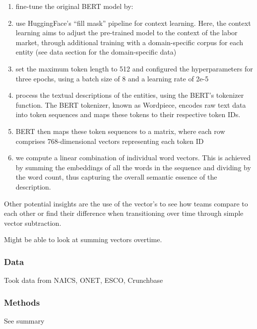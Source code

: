 \documentclass[12pt]{article}
\begin{document}
\begin{enumerate}
    \item  fine-tune the original BERT model by:
    \item use HuggingFace's “fill mask” pipeline for context learning. Here, the context learning aims to adjust the pre-trained model to the context of the labor market, through additional training with a domain-specific corpus for each entity (see data section for the domain-specific data)
    \item set the maximum token length to 512 and configured the hyperparameters for three epochs, using a batch size of 8 and a learning rate of 2e-5
    \item process the textual descriptions of the entities, using the BERT's tokenizer function. The BERT tokenizer, known as Wordpiece, encodes raw text data into token sequences and maps these tokens to their respective token IDs. 
    \item BERT then maps these token sequences to a matrix, where each row comprises 768-dimensional vectors representing each token ID
    \item  we compute a linear combination of individual word vectors. This is achieved by summing the embeddings of all the words in the sequence and dividing by the word count, thus capturing the overall semantic essence of the description. 
\end{enumerate}

Other potential insights are the use of the vector's to see how teams compare to each other or find their difference when transitioning over time through simple vector subtraction.

Might be able to look at summing vectors overtime. 


\subsubsection*{Data}

Took data from NAICS, ONET, ESCO, Crunchbase


\subsubsection*{Methods}

See summary





\end{document}

